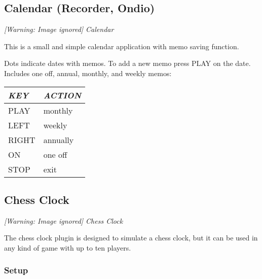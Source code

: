 \subsection{Calendar (Recorder, Ondio)}
{\centering\itshape
  [Warning: Image ignored] %
 \newline
Calendar
\par}

This is a small and simple calendar application with memo saving function.

Dots indicate dates with memos. To add a new memo press PLAY on the
date. Includes one off, annual, monthly, and weekly memos:

\begin{tabular}[c]{|p{2.6469998cm}|p{3.95cm}|}
\hline
{\centering\bfseries\itshape
KEY
\par}
&
{\centering\bfseries\itshape
ACTION
\par}
\\\hline
{\centering
PLAY
\par}
&
monthly
\\\hline
{\centering
LEFT
\par}
&
weekly
\\\hline
{\centering
RIGHT
\par}
&
annually 
\\\hline
{\centering
ON
\par}
&
one off
\\\hline
{\centering
STOP
\par}
&
exit 
\\\hline
\end{tabular}

\subsection{Chess Clock}
{\centering\itshape
  [Warning: Image ignored] %
 \newline
Chess Clock 
\par}

The chess clock plugin is designed  to
simulate a chess clock, but it can be used
in any kind of game with up to ten players.

\subsubsection{Setup}


